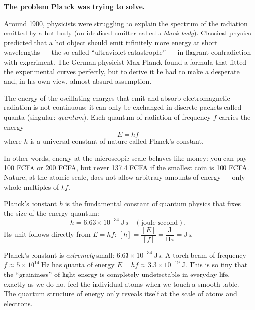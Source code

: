 \documentclass[11pt]{article}
\newcommand{\cle}[1]{{\popxbold\color{popdark}#1}}
\newcounter{popsec}
\newcounter{popsub}
\newcommand{\courssub}[1]{%
  \stepcounter{popsub}%
  \par\vspace{9pt}\noindent{\popxbold\fontsize{11.5}{13}\selectfont\color{popink}{\color{poporange}\thepopsec.\thepopsub}\hspace{6pt}#1}\par\nopagebreak\vspace{4pt}
}
\begin{document}
\courssub{Planck's Quantum Hypothesis (1900)}

\textbf{The problem Planck was trying to solve.}\par
Around 1900, physicists were struggling to explain the spectrum of the radiation emitted by a hot body (an idealised emitter called a \emph{black body}). Classical physics predicted that a hot object should emit infinitely more energy at short wavelengths --- the so-called ``ultraviolet catastrophe'' --- in flagrant contradiction with experiment. The German physicist Max Planck found a formula that fitted the experimental curves perfectly, but to derive it he had to make a desperate and, in his own view, almost absurd assumption.

\begin{definition}
The energy of the oscillating charges that emit and absorb electromagnetic radiation is not continuous: it can only be exchanged in \cle{discrete packets} called \cle{quanta} (singular: \emph{quantum}). Each quantum of radiation of frequency $f$ carries the energy
\[ E = h f \]
where $h$ is a universal constant of nature called \cle{Planck's constant}.
\end{definition}

In other words, energy at the microscopic scale behaves like money: you can pay 100 FCFA or 200 FCFA, but never 137.4 FCFA if the smallest coin is 100 FCFA. Nature, at the atomic scale, does not allow arbitrary amounts of energy --- only whole multiples of $hf$.

\begin{definition}
\cle{Planck's constant} $h$ is the fundamental constant of quantum physics that fixes the size of the energy quantum:
\[ h = 6.63 \times 10^{-34}\ \mathrm{J\,s} \quad (\text{joule-second}). \]
Its unit follows directly from $E = hf$: $[h] = \dfrac{[E]}{[f]} = \dfrac{\mathrm{J}}{\mathrm{Hz}} = \mathrm{J\,s}$.
\end{definition}

\begin{attention}
Planck's constant is \emph{extremely} small: $6.63 \times 10^{-34}\ \mathrm{J\,s}$. A torch beam of frequency $f \approx 5 \times 10^{14}\ \mathrm{Hz}$ has quanta of energy $E = hf \approx 3.3 \times 10^{-19}\ \mathrm{J}$. This is so tiny that the ``graininess'' of light energy is completely undetectable in everyday life, exactly as we do not feel the individual atoms when we touch a smooth table. The quantum structure of energy only reveals itself at the scale of atoms and electrons.
\end{attention}
\end{document}
